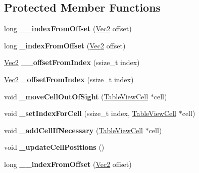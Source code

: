 \subsection*{Protected Member Functions}
\begin{DoxyCompactItemize}
\item 
\mbox{\label{classTableView_ab31070c638f0182d038cb177d64a544f}} 
long {\bfseries \+\_\+\+\_\+index\+From\+Offset} (\hyperlink{classVec2}{Vec2} offset)
\item 
\mbox{\label{classTableView_a830322563225158d0d10e658daf1f31a}} 
long {\bfseries \+\_\+index\+From\+Offset} (\hyperlink{classVec2}{Vec2} offset)
\item 
\mbox{\label{classTableView_a5d0ed22bbcb99ddee253dfb4927c3017}} 
\hyperlink{classVec2}{Vec2} {\bfseries \+\_\+\+\_\+offset\+From\+Index} (ssize\+\_\+t index)
\item 
\mbox{\label{classTableView_a9cfc9aaa07d8dc0ee99146b63ad2385a}} 
\hyperlink{classVec2}{Vec2} {\bfseries \+\_\+offset\+From\+Index} (ssize\+\_\+t index)
\item 
\mbox{\label{classTableView_a422154199b7e02298d30a62bfe4c9596}} 
void {\bfseries \+\_\+move\+Cell\+Out\+Of\+Sight} (\hyperlink{classTableViewCell}{Table\+View\+Cell} $\ast$cell)
\item 
\mbox{\label{classTableView_ac52499f81180a7a70ef3bbe5ed4c9bfe}} 
void {\bfseries \+\_\+set\+Index\+For\+Cell} (ssize\+\_\+t index, \hyperlink{classTableViewCell}{Table\+View\+Cell} $\ast$cell)
\item 
\mbox{\label{classTableView_a749a0546b3ac4113dc848fcd8c21ae1b}} 
void {\bfseries \+\_\+add\+Cell\+If\+Necessary} (\hyperlink{classTableViewCell}{Table\+View\+Cell} $\ast$cell)
\item 
\mbox{\label{classTableView_a766272288f4bd76300915020bb25b5e6}} 
void {\bfseries \+\_\+update\+Cell\+Positions} ()
\item 
\mbox{\label{classTableView_ab31070c638f0182d038cb177d64a544f}} 
long {\bfseries \+\_\+\+\_\+index\+From\+Offset} (\hyperlink{classVec2}{Vec2} offset)

\end{DoxyCompactItemize}
